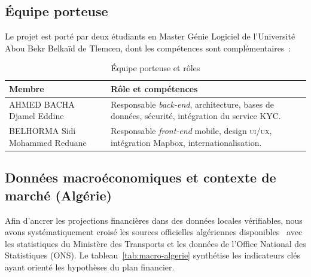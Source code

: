 \documentclass[12pt, a4paper, oneside]{report}
\begin{document}
\subsection{Équipe porteuse}

Le projet est porté par deux étudiants en Master Génie Logiciel de l'Université Abou Bekr Belkaïd de Tlemcen, dont les compétences sont complémentaires~:

\begin{table}[H]
\centering
\begin{tabularx}{\textwidth}{|l|X|}
\hline
\rowcolor{rohlight}
\textbf{Membre} & \textbf{Rôle et compétences} \\
\hline
AHMED BACHA Djamel Eddine & Responsable \textit{back-end}, architecture, bases de données, sécurité, intégration du service KYC. \\
\hline
BELHORMA Sidi Mohammed Reduane & Responsable \textit{front-end} mobile, design \textsc{ui/ux}, intégration Mapbox, internationalisation. \\
\hline
\end{tabularx}
  \caption{Équipe porteuse et rôles}
\end{table}

\subsection{Données macroéconomiques et contexte de marché (Algérie)}

Afin d'ancrer les projections financières dans des données locales vérifiables, nous avons systématiquement croisé les sources officielles algériennes disponibles~\cite{arpt_2024,gie_monetique_2024} avec les statistiques du Ministère des Transports et les données de l'Office National des Statistiques (ONS). Le tableau~\ref{tab:macro-algerie} synthétise les indicateurs clés ayant orienté les hypothèses du plan financier.
\end{document}
